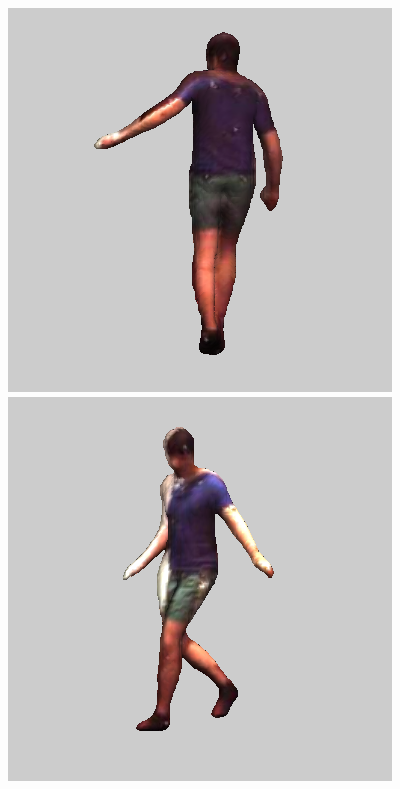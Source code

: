\begin{figure}
\includegraphics[width=0.2\linewidth]{img/results/multistack-textured/S11WalkTogether_1_60457274_mp4_frame00005__max200_pad25_jpg.png}
\includegraphics[width=0.2\linewidth]{img/results/multistack-textured/S11WalkTogether_1_60457274_mp4_frame00007__max200_pad25_jpg.png} \\ [0.5em]


\end{figure}
